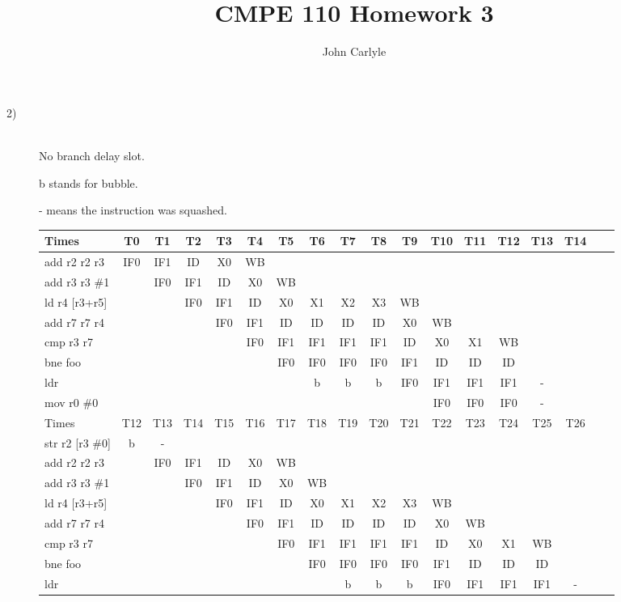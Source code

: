 \documentclass{article}
\title{CMPE 110 Homework 3}
\author{John Carlyle}
\begin{document}
\begin{description}



\item[2)] \hfill\\

  No branch delay slot.

  b stands for bubble.

  - means the instruction was squashed.

  \begin{tabular}{|l|c|c|c|c|c|c|c|c|c|c|c|c|c|c|c|c|c|}
    \hline
    Times & T0 & T1 & T2 & T3 & T4 & T5 & T6 & T7 & T8 & T9 & T10 & T11 & T12 & T13 & T14\\
    \hline
    add r2 r2 r3&IF0&IF1&ID&X0&WB&&&&&&&&&&\\
    \hline
    add r3 r3 \#1&&IF0&IF1&ID&X0&WB&&&&&&&&&\\
    \hline
    ld r4 [r3+r5]&&& IF0 & IF1 & ID & X0 & X1 & X2 & X3 & WB &&&&&\\
    \hline
    add r7 r7 r4 &&&& IF0 & IF1 & ID & ID & ID & ID  & X0 & WB &&&&\\
    \hline
    cmp r3 r7 &&&&& IF0 & IF1 & IF1 & IF1 & IF1 & ID & X0 & X1 & WB &&\\
    \hline
    bne foo &&&&&& IF0 & IF0 & IF0 & IF0 & IF1 & ID & ID & ID &&\\
    \hline
    ldr &&&&&&&b&b&b& IF0 & IF1 & IF1 & IF1 & - & \\
    \hline
    mov r0 \#0 &&&&&&&&&&& IF0 & IF0 & IF0 & - &  \\
    \hline
    \hline
    Times & T12 & T13 & T14 & T15 & T16 & T17 & T18 & T19 & T20 & T21 & T22 & T23 & T24 & T25 & T26\\
    \hline
    str r2 [r3 \#0] & b & - &&&&&&&&&&&&&\\
    \hline
    add r2 r2 r3 && IF0 & IF1 & ID & X0 & WB &&&&&&&&&\\
    \hline
    add r3 r3 \#1&&& IF0 & IF1 & ID & X0 & WB &&&&&&&&\\
    \hline
    ld r4 [r3+r5]&&&& IF0 & IF1 & ID & X0 & X1 & X2 & X3 & WB &&&&\\
    \hline
    add r7 r7 r4 &&&&& IF0 & IF1 & ID & ID & ID & ID  & X0 & WB &&&\\
    \hline
    cmp r3 r7 &&&&&& IF0 & IF1 & IF1 & IF1 & IF1 & ID & X0 & X1 & WB &\\
    \hline
    bne foo &&&&&&& IF0 & IF0 & IF0 & IF0 & IF1 & ID & ID & ID &\\
    \hline
    ldr &&&&&&&&b&b&b& IF0 & IF1 & IF1 & IF1 & - \\
    \hline
  \end{tabular}


\end{description}
\end{document}

